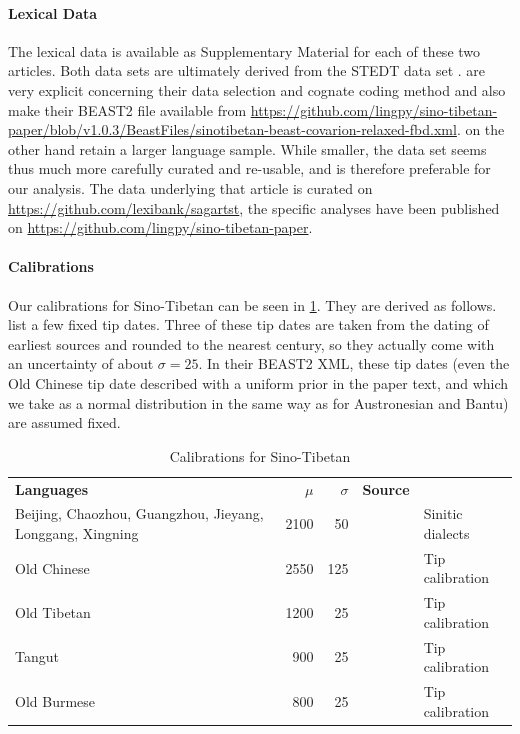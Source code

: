\documentclass[]{rsos}%
\begin{document}
\paragraph{Lexical Data}
The lexical data is available as Supplementary Material for each of these two
articles. Both data sets are ultimately derived from the STEDT data set
\parencite{stedt}.  are very explicit concerning their
data selection and cognate coding method and also make their BEAST2 file available from \url{https://github.com/lingpy/sino-tibetan-paper/blob/v1.0.3/BeastFiles/sinotibetan-beast-covarion-relaxed-fbd.xml}.
 on the other hand retain a larger language sample.
While smaller, the \textcite{sagart2019dated} data set seems thus much more carefully
curated and re-usable, and is therefore preferable for our analysis.
The data underlying that article is curated on \url{https://github.com/lexibank/sagartst}, the specific analyses have been published on \url{https://github.com/lingpy/sino-tibetan-paper}.

\paragraph{Calibrations}
Our calibrations for Sino-Tibetan can be seen in \cref{t:sinotibetan}. They are derived as follows.
\Textcite{sagart2019dated} list a few fixed tip dates. Three of these tip dates are taken from the dating of earliest sources and rounded to the nearest century, so they actually come with an uncertainty of about $\sigma=25$. In their BEAST2 XML, these tip dates (even the Old Chinese tip date described with a uniform prior in the paper text, and which we take as a normal distribution in the same way as for Austronesian and Bantu) are assumed fixed.
\begin{table}
  \centering
    \begin{tabular}{p{7cm}rrcl}
    \textbf{Languages} & \textbf{$\mu$} & \textbf{$\sigma$} & \textbf{Source} \\
Beijing, Chaozhou, Guangzhou, Jieyang, Longgang, Xingning & 2100 & 50 & \parencite{sagart2019dated} & Sinitic dialects \\
     Old Chinese & 2550 & 125& \parencite{sagart2019dated} & Tip calibration \\
     Old Tibetan & 1200 & 25& \parencite{sagart2019dated} & Tip calibration \\
     Tangut & 900 & 25& \parencite{sagart2019dated} & Tip calibration \\
     Old Burmese & 800 & 25& \parencite{sagart2019dated} & Tip calibration \\
\end{tabular}
  \caption{Calibrations for Sino-Tibetan}
  \label{t:sinotibetan}
\end{table}
\end{document}
